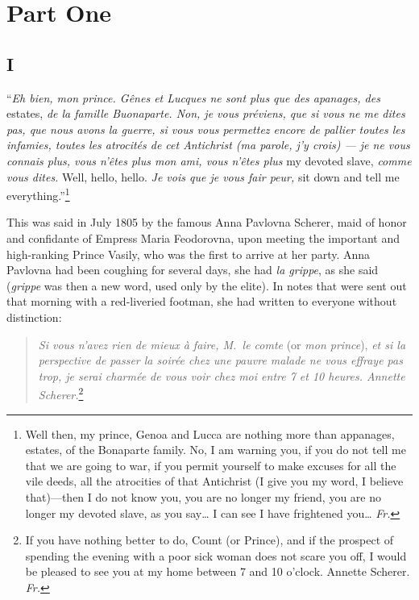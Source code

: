 
\chapter*{Part One} %

\section*{I} %

``\textit{Eh bien, mon prince. G\^enes et Lucques ne sont plus que des
  apanages, des} estates, \textit{de la famille Buonaparte. Non, je
  vous pr\'eviens, que si vous ne me dites pas, que nous avons la
  guerre, si vous vous permettez encore de pallier toutes les
  infamies, toutes les atrocit\'es de cet Antichrist (ma parole, j'y
  crois) --- je ne vous connais plus, vous n'\^etes plus mon ami, vous
  n'\^etes plus} my devoted slave, \textit{comme vous dites.} Well,
hello, hello. \textit{Je vois que je vous fair peur,} sit down and
tell me everything.''\footnote{Well then, my prince, Genoa and Lucca
  are nothing more than appanages, estates, of the Bonaparte
  family. No, I am warning you, if you do not tell me that we are
  going to war, if you permit yourself to make excuses for all the
  vile deeds, all the atrocities of that Antichrist (I give you my
  word, I believe that)---then I do not know you, you are no longer my
friend, you are no longer my devoted slave, as you say\ldots{} I can
see I have frightened you\ldots{} \textit{Fr.}} %

This was said in July 1805 by the famous Anna Pavlovna Scherer, maid
of honor and confidante of Empress Maria Feodorovna, upon meeting the
important and high-ranking Prince Vasily, who was the first to arrive
at her party. Anna Pavlovna had been coughing for several days, she
had \textit{la grippe}, as she said (\textit{grippe} was then a new
word, used only by the elite). In notes that were sent out that
morning with a red-liveried footman, she had written to everyone
without distinction:

\begin{quote}
\textit{Si vous n'avez rien de mieux \`a faire, M.~le comte} (or
\textit{mon prince}), \textit{et si la perspective de passer la
  soir\'ee chez une pauvre malade ne vous effraye pas trop, je serai
  charm\'ee de vous voir chez moi entre 7 et 10 heures. Annette
  Scherer.}\footnote{If you have nothing better to do, Count (or
  Prince), and if the prospect of spending the evening with a poor
  sick woman does not scare you off, I would be pleased to see you at
  my home between 7 and 10 o'clock. Annette Scherer. \textit{Fr.}}
\end{quote}

